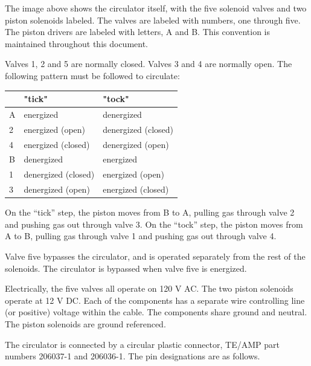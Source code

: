 \documentclass{manual}
\begin{document}
The image above shows the circulator itself, with the five solenoid valves and two piston solenoids labeled.
The valves are labeled with numbers, one through five.
The piston drivers are labeled with letters, A and B.
This convention is maintained throughout this document.

Valves 1, 2 and 5 are normally closed.
Valves 3 and 4 are normally open.
The following pattern must be followed to circulate:

\begin{table}[h]
\begin{tabular}{l|ll}
  & "tick" & "tock" \\ \hline
A & energized & denergized \\
2 & energized (open) & denergized (closed) \\
4 & energized (closed) & denergized (open) \\
B & denergized & energized \\
1 & denergized (closed) & energized (open) \\
3 & denergized (open) & energized (closed)
\end{tabular}
\end{table}

On the ``tick'' step, the piston moves from B to A, pulling gas through valve 2 and pushing gas out through valve 3.
On the ``tock'' step, the piston moves from A to B, pulling gas through valve 1 and pushing gas out through valve 4.

Valve five bypasses the circulator, and is operated separately from the rest of the solenoids.
The circulator is bypassed when valve five is energized.

\clearpage

Electrically, the five valves all operate on 120 V AC.
The two piston solenoids operate at 12 V DC.
Each of the components has a separate wire controlling line (or positive) voltage within the cable.
The components share ground and neutral.
The piston solenoids are ground referenced.

The circulator is connected by a circular plastic connector, TE/AMP part numbers 206037-1 and 206036-1.
The pin designations are as follows.
\end{document}
